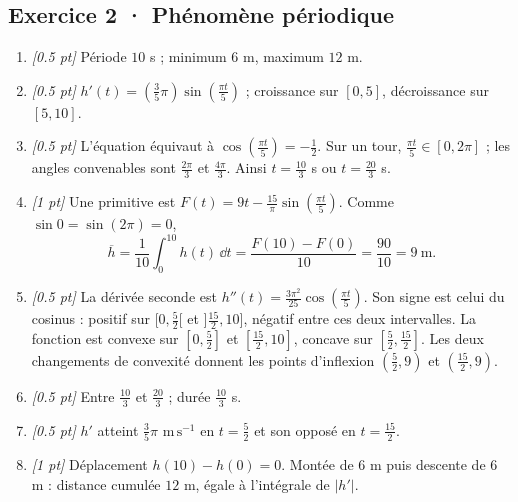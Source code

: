 \subsection*{Exercice 2 · Phénomène périodique}\begin{enumerate}

\item \textit{[\num{0,5} pt]} Période $10$ s ; minimum $6$ m, maximum $12$ m.

\item \textit{[\num{0,5} pt]} $h'(t)=(\frac{3}{5}\pi)\sin (\frac{\pi t}{5})$ ; croissance sur $[0,5]$, décroissance sur $[5,10]$.

\item \textit{[\num{0,5} pt]} L'équation équivaut à $\cos (\frac{\pi t}{5})=-\frac{1}{2}$. Sur un tour, $\frac{\pi t}{5}\in[0,2\pi]$ ; les angles convenables sont $\frac{2\pi}{3}$ et $\frac{4\pi}{3}$. Ainsi $t=\frac{10}{3}$ s ou $t=\frac{20}{3}$ s.

\item \textit{[1 pt]} Une primitive est $F(t)=9t-\frac{15}{\pi}\sin (\frac{\pi t}{5})$. Comme $\sin0=\sin(2\pi)=0$,
\[\overline h=\frac{1}{10}\int_0^{10}h(t)\,\dd t=\frac{F(10)-F(0)}{10}=\frac{90}{10}=9\ \mathrm{m}.\]

\item \textit{[\num{0,5} pt]} La dérivée seconde est $h''(t)=\frac{3\pi^2}{25}\cos (\frac{\pi t}{5})$. Son signe est celui du cosinus : positif sur $[0,\frac{5}{2}[$ et $]\frac{15}{2},10]$, négatif entre ces deux intervalles. La fonction est convexe sur $[0,\frac{5}{2}]$ et $[\frac{15}{2},10]$, concave sur $[\frac{5}{2},\frac{15}{2}]$. Les deux changements de convexité donnent les points d'inflexion $(\frac{5}{2},9)$ et $(\frac{15}{2},9)$.

\item \textit{[\num{0,5} pt]} Entre $\frac{10}{3}$ et $\frac{20}{3}$ ; durée $\frac{10}{3}$ s.

\item \textit{[\num{0,5} pt]} $h'$ atteint $\frac{3}{5}\pi$ $\mathrm{m\,s^{-1}}$ en $t=\frac{5}{2}$ et son opposé en $t=\frac{15}{2}$.

\item \textit{[1 pt]} Déplacement $h(10)-h(0)=0$. Montée de $6$ m puis descente de $6$ m : distance cumulée $12$ m, égale à l'intégrale de $|h'|$.

\end{enumerate}

